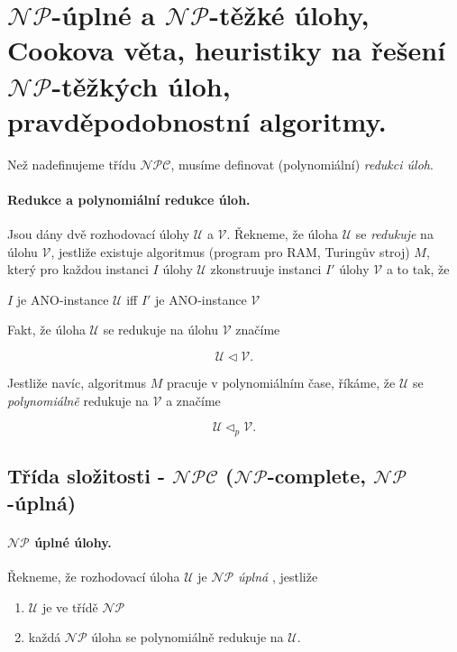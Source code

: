 \section[TAL - $\mathcal{NP}$ (complete, hard), Cookova věta, ..]{$\mathcal{NP}$-úplné a $\mathcal{NP}$-těžké úlohy, Cookova věta, heuristiky na řešení $\mathcal{NP}$-těžkých úloh, pravděpodobnostní algoritmy.}

Než nadefinujeme třídu $\mathcal{NPC}$, musíme definovat (polynomiální) \textit{redukci úloh}.

\paragraph{Redukce a polynomiální redukce úloh.} Jsou dány dvě rozhodovací úlohy $\mathcal{U}$ a $\mathcal{V}$. Řekneme, že úloha $\mathcal{U}$ se \textit{redukuje} na úlohu $\mathcal{V}$, jestliže existuje algoritmus (program pro RAM, Turingův stroj) $M$, který pro každou instanci $I$ úlohy $\mathcal{U}$ zkonstruuje instanci $I'$ úlohy $\mathcal{V}$ a to tak, že

\begin{center}
    $I$ je ANO-instance $\mathcal{U}$ iff $I'$ je ANO-instance $\mathcal{V}$
\end{center}

\noindent Fakt, že úloha $\mathcal{U}$ se redukuje na úlohu $\mathcal{V}$ značíme

$$\mathcal{U} \lhd \mathcal{V}.$$

Jestliže navíc, algoritmus $M$ pracuje v polynomiálním čase, říkáme, že $\mathcal{U}$ se \textit{polynomiálně} redukuje na $\mathcal{V}$ a značíme

$$\mathcal{U} \lhd_p \mathcal{V}.$$

\subsection*{Třída složitosti - $\mathcal{NPC}$ ($\mathcal{NP}$-complete, $\mathcal{NP}$-úplná)}
\label{heading:npc}

\paragraph{$\mathcal{NP}$ úplné úlohy.} Řekneme, že rozhodovací úloha $\mathcal{U}$ je $\mathcal{NP}$ \textit{úplná }, jestliže

\begin{enumerate}[itemsep=0pt]
    \item $\mathcal{U}$ je ve třídě $\mathcal{NP}$
    \item každá $\mathcal{NP}$ úloha se polynomiálně redukuje na $\mathcal{U}$.
\end{enumerate}

